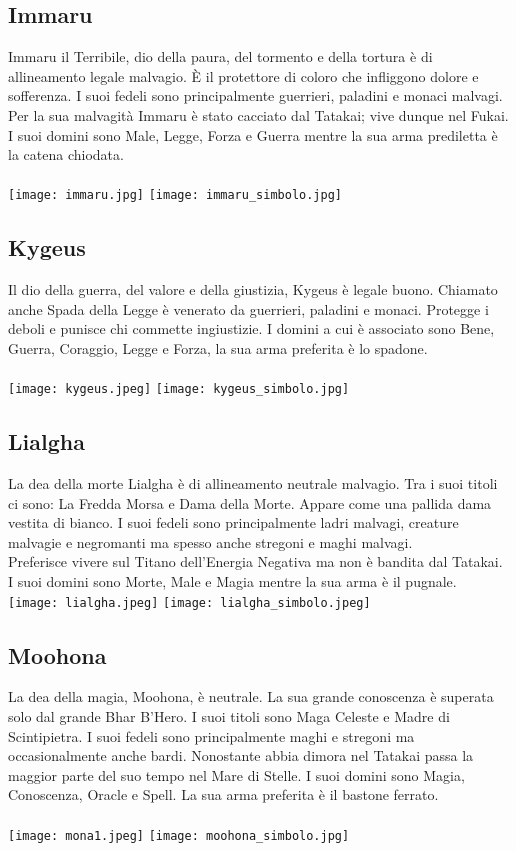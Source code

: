 \documentclass[a4paper]{report}
\begin{document}
\begin{multicols}{2}
\subsection*{Immaru}
Immaru il Terribile, dio della paura, del tormento e della tortura è di allineamento legale malvagio. È il protettore di coloro che infliggono dolore e sofferenza. I suoi fedeli sono principalmente guerrieri, paladini e monaci malvagi. Per la sua malvagità Immaru è stato cacciato dal Tatakai; vive dunque nel Fukai. I suoi domini sono Male, Legge, Forza e Guerra mentre la sua arma prediletta è la catena chiodata.\\
\\
\texttt{[image: immaru.jpg]}
\texttt{[image: immaru\_simbolo.jpg]}\\
\subsection*{Kygeus}
Il dio della guerra, del valore e della giustizia, Kygeus è legale buono. Chiamato anche Spada della Legge è venerato da guerrieri, paladini e monaci.
Protegge i deboli e punisce chi commette ingiustizie. 
I domini a cui è associato sono Bene, Guerra, Coraggio, Legge e Forza, la sua arma preferita è lo spadone.\\
\\
\texttt{[image: kygeus.jpeg]}
\texttt{[image: kygeus\_simbolo.jpg]}
\subsection*{Lialgha}
La dea della morte Lialgha è di allineamento neutrale malvagio. Tra i suoi titoli ci sono: La Fredda Morsa e Dama della Morte. Appare come una pallida dama vestita di bianco. I suoi fedeli sono principalmente ladri malvagi, creature malvagie e negromanti ma spesso anche stregoni e maghi malvagi.\\
Preferisce vivere sul Titano dell'Energia Negativa ma non è bandita dal Tatakai. I suoi domini sono Morte, Male e Magia mentre la sua arma è il pugnale.
\\
\texttt{[image: lialgha.jpeg]}
\texttt{[image: lialgha\_simbolo.jpeg]}
\subsection*{Moohona}
La dea della magia, Moohona, è neutrale. La sua grande conoscenza è superata solo dal grande Bhar B'Hero. I suoi titoli sono Maga Celeste e Madre di Scintipietra. I suoi fedeli sono principalmente maghi e stregoni ma occasionalmente anche bardi. Nonostante abbia dimora nel Tatakai passa la maggior parte del suo tempo nel Mare di Stelle. I suoi domini sono Magia, Conoscenza, Oracle e Spell. La sua arma preferita è il bastone ferrato.\\
\\
\texttt{[image: mona1.jpeg]}
\texttt{[image: moohona\_simbolo.jpg]}

\end{multicols}
\end{document}
